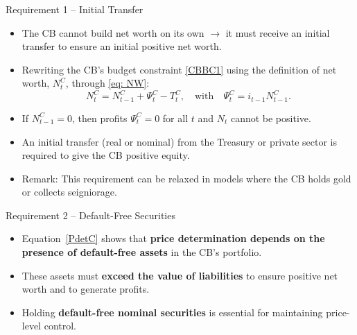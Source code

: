 \documentclass[11pt,aspectratio=169]{beamer}
\begin{document}
\begin{frame}{Requirement 1 -- Initial Transfer}
\begin{itemize}
    \item The CB cannot build net worth on its own $\rightarrow$ it must receive an initial transfer to ensure an initial positive net worth.
    \vspace{0.25cm}
    \item Rewriting the CB's budget constraint \eqref{CBBC1} using the definition of net worth, $N_t^C$, through \eqref{eq: NW}:
    \[
    N_t^C = N_{t-1}^C + \Psi_t^C - T_t^C, 
     \quad \text{with} \quad \Psi_t^C = i_{t-1} N_{t-1}^C.
    \]
    \vspace{0.25cm}
    \item If $N_{t-1}^C = 0$, then profits $\Psi_t^C = 0$ for all $t$ and $N_{t}$ cannot be positive.
    \vspace{0.25cm}
    \item  An initial transfer (real or nominal) from the Treasury or private sector is required to give the CB positive equity.
    \vspace{0.25cm}
    \item Remark: 
    This requirement can be relaxed in models where the CB holds gold or collects seigniorage.
\end{itemize}
\end{frame}

\begin{frame}{Requirement 2 – Default-Free Securities}


\begin{itemize}
  \item Equation~\eqref{PdetC} shows that \textbf{price determination depends on the presence of default-free assets} in the CB’s portfolio.

  \vspace{0.25cm}
  \item These assets must \textbf{exceed the value of liabilities} to ensure positive net worth and to generate profits.

  \vspace{0.25cm}
  \item Holding \textbf{default-free nominal securities} is essential for maintaining price-level control.
\end{itemize}

\end{frame}
\end{document}
